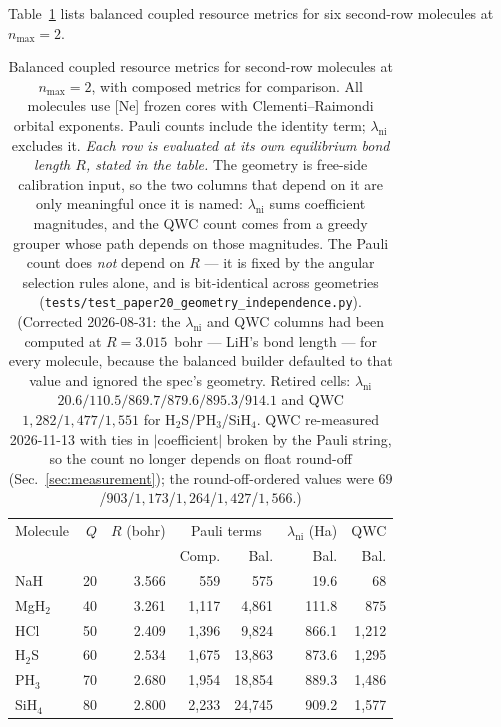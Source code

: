 \documentclass[aps,pra,twocolumn,superscriptaddress,longbibliography]{revtex4-2}
\begin{document}
Table~\ref{tab:second_row} lists balanced coupled resource metrics
for six second-row molecules at $n_{\max} = 2$.

\begin{table}[t]
\caption{Balanced coupled resource metrics for second-row molecules
  at $n_{\max} = 2$, with composed metrics for comparison.
  All molecules use [Ne] frozen cores with Clementi--Raimondi
  orbital exponents.  Pauli counts include
  the identity term; $\lambda_{\text{ni}}$ excludes it.
  \emph{Each row is evaluated at its own equilibrium bond length $R$,
  stated in the table.}  The geometry is free-side calibration input, so
  the two columns that depend on it are only meaningful once it is named:
  $\lambda_{\text{ni}}$ sums coefficient magnitudes, and the QWC count
  comes from a greedy grouper whose path depends on those magnitudes.
  The Pauli count does \emph{not} depend on $R$ --- it is fixed by the
  angular selection rules alone, and is bit-identical across geometries
  (\texttt{tests/test\_paper20\_geometry\_independence.py}).
  (Corrected 2026-08-31: the $\lambda_{\text{ni}}$ and QWC columns had
  been computed at $R = 3.015$~bohr --- LiH's bond length --- for every
  molecule, because the balanced builder defaulted to that value and
  ignored the spec's geometry.  Retired cells: $\lambda_{\text{ni}}$
  $20.6/110.5/869.7/879.6/895.3/914.1$ and QWC $1{,}282/1{,}477/1{,}551$
  for H$_2$S/PH$_3$/SiH$_4$.  QWC re-measured 2026-11-13 with ties in
  $|$coefficient$|$ broken by the Pauli string, so the count no longer
  depends on float round-off (Sec.~\ref{sec:measurement}); the
  round-off-ordered values were $69$/$903$/$1{,}173$/$1{,}264$/$1{,}427$/$1{,}566$.)}
\label{tab:second_row}
\begin{ruledtabular}
\begin{tabular}{lrrrrrr}
Molecule & $Q$ & $R$ (bohr) & \multicolumn{2}{c}{Pauli terms}
  & $\lambda_{\text{ni}}$ (Ha) & QWC \\
  & & & Comp. & Bal. & Bal. & Bal. \\
\hline
NaH      &  20 & 3.566 &    559 &    575 &  19.6 &    68 \\
MgH$_2$  &  40 & 3.261 & 1{,}117 & 4{,}861 & 111.8 &   875 \\
HCl      &  50 & 2.409 & 1{,}396 & 9{,}824 & 866.1 & 1{,}212 \\
H$_2$S   &  60 & 2.534 & 1{,}675 & 13{,}863 & 873.6 & 1{,}295 \\
PH$_3$   &  70 & 2.680 & 1{,}954 & 18{,}854 & 889.3 & 1{,}486 \\
SiH$_4$  &  80 & 2.800 & 2{,}233 & 24{,}745 & 909.2 & 1{,}577 \\
\end{tabular}
\end{ruledtabular}
\end{table}
\end{document}
